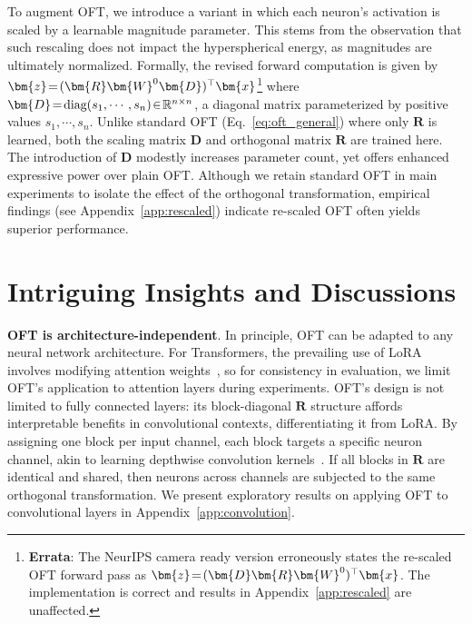 {To augment OFT, we introduce a variant in which each neuron’s activation is scaled by a learnable magnitude parameter. This stems from the observation that such rescaling does not impact the hyperspherical energy, as magnitudes are ultimately normalized. Formally, the revised forward computation is given by $\thickmuskip=2mu \medmuskip=2mu\bm{z}=(\bm{R}\bm{W}^0\bm{D})^\top\bm{x}$\footnote{\textbf{Errata}: The NeurIPS camera ready version erroneously states the re-scaled OFT forward pass as $\thickmuskip=2mu \medmuskip=2mu\bm{z}=(\bm{D}\bm{R}\bm{W}^0)^\top\bm{x}$. The implementation is correct and results in Appendix~\ref{app:rescaled} are unaffected.} where $\thickmuskip=2mu \medmuskip=2mu \bm{D}=\text{diag}(s_1,\cdots,s_n)\in\mathbb{R}^{n\times n}$, a diagonal matrix parameterized by positive values $s_1,\cdots,s_n$. Unlike standard OFT (Eq.~\eqref{eq:oft_general}) where only $\bm{R}$ is learned, both the scaling matrix $\bm{D}$ and orthogonal matrix $\bm{R}$ are trained here. The introduction of $\bm{D}$ modestly increases parameter count, yet offers enhanced expressive power over plain OFT. Although we retain standard OFT in main experiments to isolate the effect of the orthogonal transformation, empirical findings (see Appendix~\ref{app:rescaled}) indicate re-scaled OFT often yields superior performance.

\section{Intriguing Insights and Discussions}

\textbf{OFT is architecture-independent}. In principle, OFT can be adapted to any neural network architecture. For Transformers, the prevailing use of LoRA involves modifying attention weights~\cite{hulora2022}, so for consistency in evaluation, we limit OFT’s application to attention layers during experiments. OFT’s design is not limited to fully connected layers: its block-diagonal $\bm{R}$ structure affords interpretable benefits in convolutional contexts, differentiating it from LoRA. By assigning one block per input channel, each block targets a specific neuron channel, akin to learning depthwise convolution kernels~\cite{chollet2017xception}. If all blocks in $\bm{R}$ are identical and shared, then neurons across channels are subjected to the same orthogonal transformation. We present exploratory results on applying OFT to convolutional layers in Appendix~\ref{app:convolution}.

}
